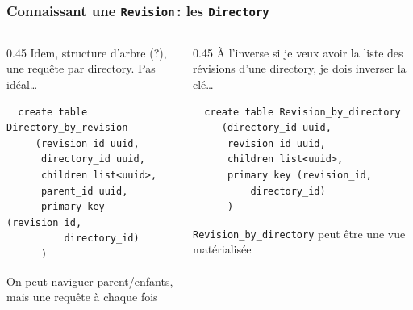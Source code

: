	
\begin{frame}[fragile] \frametitle{Connaissant une \texttt{Revision}\,: les \texttt{Directory}}


\begin{columns}
    \begin{column}{0.45\textwidth}
    Idem, structure d'arbre (?), une requête
  par directory. Pas idéal\ldots
  
  \vfill
  
   \begin{verbatim}
  create table Directory_by_revision
     (revision_id uuid,
      directory_id uuid,
      children list<uuid>,
      parent_id uuid,
      primary key (revision_id,
          directory_id)
      )
  \end{verbatim}

   On peut naviguer parent/enfants, mais une requête à chaque fois
   \end{column}
 \begin{column}{0.45\textwidth}
     À l'inverse si je veux avoir la liste des révisions
     d'une directory, je dois inverser la clé\ldots
   \begin{verbatim}
  create table Revision_by_directory 
     (directory_id uuid,
      revision_id uuid,
      children list<uuid>,
      primary key (revision_id,
          directory_id)
      )
  \end{verbatim}
   \texttt{Revision\_by\_directory} peut être une \alert{vue matérialisée}
    
\end{column}
\end{columns}
	
\end{frame}

